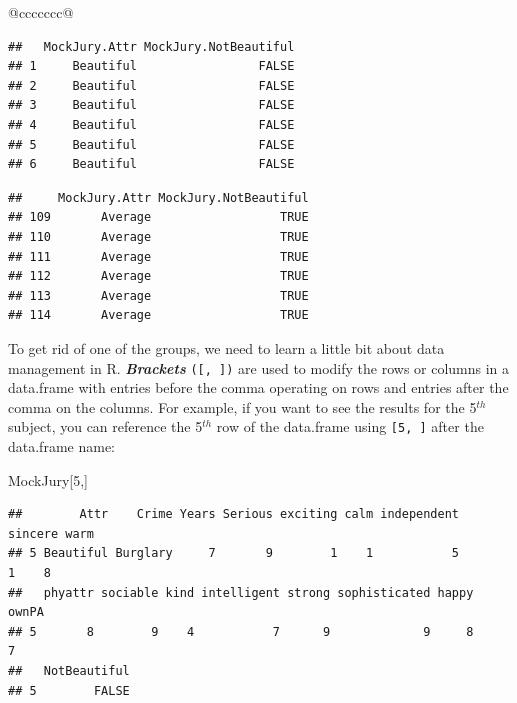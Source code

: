 \documentclass[]{book}
\newenvironment{Shaded}{\begin{snugshade}}{\end{snugshade}}
\newcommand{\KeywordTok}[1]{\textcolor[rgb]{0.13,0.29,0.53}{\textbf{#1}}}
\newcommand{\DecValTok}[1]{\textcolor[rgb]{0.00,0.00,0.81}{#1}}
\newcommand{\OperatorTok}[1]{\textcolor[rgb]{0.81,0.36,0.00}{\textbf{#1}}}
\newcommand{\NormalTok}[1]{#1}
\theoremstyle{definition}
\theoremstyle{definition}
\theoremstyle{remark}
\begin{document}
\begin{longtable}[]{@{}ccccccc@{}}
\begin{minipage}[b]{0.10\columnwidth}
\begin{verbatim}
##   MockJury.Attr MockJury.NotBeautiful
## 1     Beautiful                 FALSE
## 2     Beautiful                 FALSE
## 3     Beautiful                 FALSE
## 4     Beautiful                 FALSE
## 5     Beautiful                 FALSE
## 6     Beautiful                 FALSE
\end{verbatim}

\newpage

\begin{Shaded}
\end{Shaded}

\begin{verbatim}
##     MockJury.Attr MockJury.NotBeautiful
## 109       Average                  TRUE
## 110       Average                  TRUE
## 111       Average                  TRUE
## 112       Average                  TRUE
## 113       Average                  TRUE
## 114       Average                  TRUE
\end{verbatim}

To get rid of one of the groups, we need to learn a little bit about
data management in R. \textbf{\emph{Brackets}} \texttt{({[},\ {]})} are
used to modify the rows or columns in a data.frame with entries before
the comma operating on rows and entries after the comma on the columns.
For example, if you want to see the results for the 5\(^{th}\) subject,
you can reference the 5\(^{th}\) row of the data.frame using
\texttt{{[}5,\ {]}} after the data.frame name:

\begin{Shaded}
\begin{Highlighting}[]
\NormalTok{MockJury[}\DecValTok{5}\NormalTok{,]}
\end{Highlighting}
\end{Shaded}

\begin{verbatim}
##        Attr    Crime Years Serious exciting calm independent sincere warm
## 5 Beautiful Burglary     7       9        1    1           5       1    8
##   phyattr sociable kind intelligent strong sophisticated happy ownPA
## 5       8        9    4           7      9             9     8     7
##   NotBeautiful
## 5        FALSE
\end{verbatim}


\end{minipage}
\end{longtable}
\end{document}
